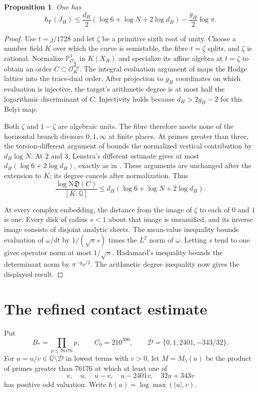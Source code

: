 \documentclass[11pt,a4paper]{article}
\newtheorem{proposition}[theorem]{Proposition}
\theoremstyle{definition}\newtheorem{remark}[theorem]{Remark}
\newcommand{\Q}{\mathbb Q}\newcommand{\Z}{\mathbb Z}
\newcommand{\hF}{h_{\mathrm F}}
\begin{document}
\begin{proposition}\label{prop:unitfibre}
One has
\[
 \hF(J_H)\le\frac{d_H}{2}
           (\log6+\log N+2\log d_H)-\frac{g_H}{2}\log\pi.
\]
\end{proposition}
\begin{proof}
Use $t=j/1728$ and let $\zeta$ be a primitive sixth root of unity.
Choose a number field $K$ over which the curve is semistable, the
fibre $t=\zeta$ splits, and $\zeta$ is rational. Normalize
$\mathbb P^1_{\mathcal O_K}$ in $K(X_H)$ and specialize its affine
algebra at $t=\zeta$ to obtain an order $C\subset\mathcal O_K^{d_H}$.
The integral evaluation argument of \cite[Sections~1--3]{Evaluation}
maps the Hodge lattice into the trace-dual order. After projection to
$g_H$ coordinates on which evaluation is injective, the target's
arithmetic degree is at most half the logarithmic discriminant of $C$.
Injectivity holds because $d_H>2g_H-2$ for this Belyi map.

Both $\zeta$ and $1-\zeta$ are algebraic units. The fibre therefore
meets none of the horizontal branch divisors $0,1,\infty$ at finite
places. At primes greater than three, the torsion-different argument
of \cite[Lemma~4.2]{Evaluation} bounds the normalized vertical
contribution by $d_H\log N$. At $2$ and $3$, Lenstra's different
estimate gives at most $d_H(\log6+2\log d_H)$, exactly as in
\cite[Section~4]{Evaluation}. These arguments are unchanged after
the extension to $K$; its degree cancels after normalization.
Thus
\[
 \frac{\log\mathrm N\mathfrak D(C)}{[K:\Q]}
       \le d_H(\log6+\log N+2\log d_H).
\]

At every complex embedding, the distance from the image of $\zeta$
to each of $0$ and $1$ is one. Every disk of radius $s<1$ about
that image is unramified, and its inverse image consists of disjoint
analytic sheets. The mean-value inequality bounds evaluation of
$\omega/dt$ by $1/(\sqrt\pi s)$ times the $L^2$ norm of $\omega$.
Letting $s$ tend to one gives operator norm at most $1/\sqrt\pi$.
Hadamard's inequality bounds the determinant norm by $\pi^{-g_H/2}$.
The arithmetic degree inequality now gives the displayed result.
\end{proof}

\section{The refined contact estimate}

Put
\[
 B_* =\prod_{p\le76176}p,\qquad C_0=210^{300},\qquad
 \mathcal D=\{0,1,2401,-343/32\}.
\]
For $a=u/v\in\Q\setminus\mathcal D$ in lowest terms with $v>0$,
let $M=M_5(a)$ be the product of primes greater than $76176$ at
which at least one of
\[
 v,\quad u,\quad u-v,\quad u-2401v,\quad32u+343v
\]
has positive odd valuation. Write $h(a)=\log\max(|u|,v)$.
\end{document}
